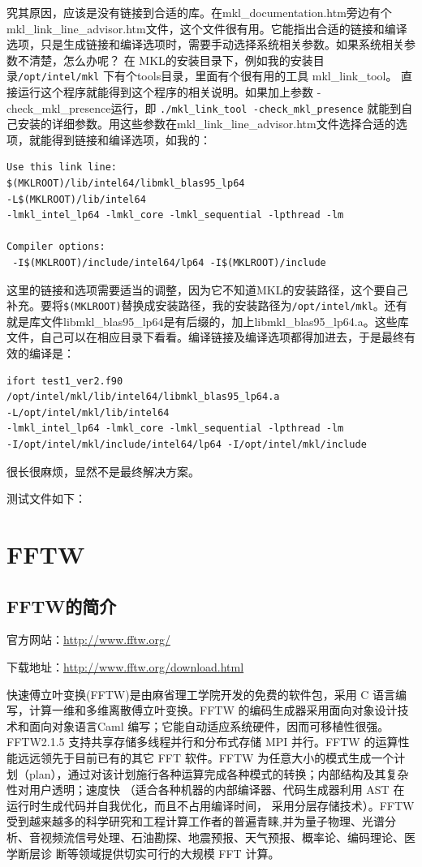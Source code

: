 究其原因，应该是没有链接到合适的库。在mkl\_documentation.htm旁边有个
mkl\_link\_line\_advisor.htm文件，这个文件很有用。它能指出合适的链接和编译选项，只是生成链接和编译选项时，需要手动选择系统相关参数。如果系统相关参数不清楚，怎么办呢？ 在 MKL的安装目录下，例如我的安装目录\verb|/opt/intel/mkl| 下有个tools目录，里面有个很有用的工具 mkl\_link\_tool。 直接运行这个程序就能得到这个程序的相关说明。如果加上参数 -check\_mkl\_presence运行，即 \verb|./mkl_link_tool -check_mkl_presence| 就能到自己安装的详细参数。用这些参数在mkl\_link\_line\_advisor.htm文件选择合适的选项，就能得到链接和编译选项，如我的：
\begin{verbatim}
Use this link line: 
$(MKLROOT)/lib/intel64/libmkl_blas95_lp64 
-L$(MKLROOT)/lib/intel64 
-lmkl_intel_lp64 -lmkl_core -lmkl_sequential -lpthread -lm

Compiler options: 
 -I$(MKLROOT)/include/intel64/lp64 -I$(MKLROOT)/include
\end{verbatim}
这里的链接和选项需要适当的调整，因为它不知道MKL的安装路径，这个要自己补充。要将\verb|$(MKLROOT)|替换成安装路径，我的安装路径为\verb|/opt/intel/mkl|。还有就是库文件libmkl\_blas95\_lp64是有后缀的，加上libmkl\_blas95\_lp64.a。这些库文件，自己可以在相应目录下看看。编译链接及编译选项都得加进去，于是最终有效的编译是：
\begin{verbatim}
ifort test1_ver2.f90 
/opt/intel/mkl/lib/intel64/libmkl_blas95_lp64.a 
-L/opt/intel/mkl/lib/intel64 
-lmkl_intel_lp64 -lmkl_core -lmkl_sequential -lpthread -lm 
-I/opt/intel/mkl/include/intel64/lp64 -I/opt/intel/mkl/include
\end{verbatim}
很长很麻烦，显然不是最终解决方案。

测试文件如下：







\section{FFTW}
\subsection{FFTW的简介}
官方网站：\url{http://www.fftw.org/}

下载地址：\url{http://www.fftw.org/download.html}

快速傅立叶变换(FFTW)是由麻省理工学院开发的免费的软件包，采用 C 语言编写，计算一维和多维离散傅立叶变换。FFTW 的编码生成器采用面向对象设计技术和面向对象语言Caml 编写；它能自动适应系统硬件，因而可移植性很强。FFTW2.1.5 支持共享存储多线程并行和分布式存储 MPI 并行。FFTW 的运算性能远远领先于目前已有的其它 FFT 软件。FFTW 为任意大小的模式生成一个计划（plan），通过对该计划施行各种运算完成各种模式的转换；内部结构及其复杂性对用户透明；速度快 （适合各种机器的内部编译器、代码生成器利用 AST 在运行时生成代码并自我优化，而且不占用编译时间，
采用分层存储技术）。FFTW 受到越来越多的科学研究和工程计算工作者的普遍青睐,并为量子物理、光谱分析、音视频流信号处理、石油勘探、地震预报、天气预报、概率论、编码理论、医学断层诊
断等领域提供切实可行的大规模 FFT 计算。


